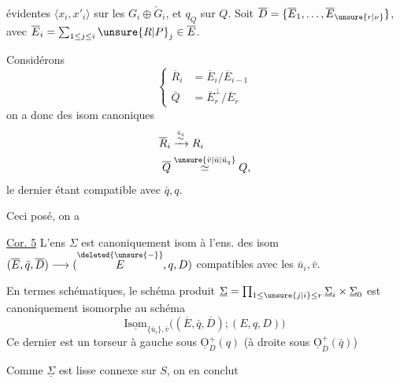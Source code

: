 évidentes $\langle x_i,x'_i\rangle$ sur les $G_i\oplus\check G_i$, et $q_Q$ sur $Q$.  Soit $\overline D=\{\overline E_1,\ldots,\overline E_{\unsure{r|\nu}}\}$, avec $\overline E_i=\sum_{1\leq j\leq i}\unsure{R|P}_j\in\overline E$. 

Considérons
\[
\left\{\begin{aligned}
\overline R_i&=\overline E_i/\overline E_{i-1}\\
\overline Q&=\overline E_r^\perp/\overline E_r
\end{aligned}\right.
\]
on a donc des isom canoniques
\[
\begin{aligned}
\overline R_i&\xrightarrow{\overset{\bar u_i}{\sim}}R_i\\
\overline Q&\mathrel{\overset{\unsure{\bar v|\bar u|\bar u_q}}{\simeq}}Q,
\end{aligned}
\]
le dernier étant compatible avec $\bar q,q$.

Ceci posé, on a

\uline{Cor. 5} L'ens $\Sigma$ est canoniquement isom à l'ens. des isom $(\overline E,\bar q,\overline D)\longrightarrow(\overset{\deleted{\unsure{-}}}{E},q,D)$ compatibles avec les $\bar u_i,\bar v$.

En termes schématiques, le schéma produit $\underline\Sigma=\prod_{1\leq\unsure{j|i}\leq r}\underline\Sigma_i\times\underline\Sigma_0$ est canoniquement isomorphe au schéma
\[
\underline{\mathrm{Isom}}_{\{\bar u_i\},\bar v}\big((\overline E,\bar q,\overline D);(E,q,D)\big)
\]
%
Ce dernier est un torseur à gauche sous $\underline{\mathrm O}_D^+(q)$ (à droite sous $\underline{\mathrm O}_{\overline D}^{+}(\bar q)$)

Comme $\underline\Sigma$ est  lisse connexe sur $S$, on en conclut
